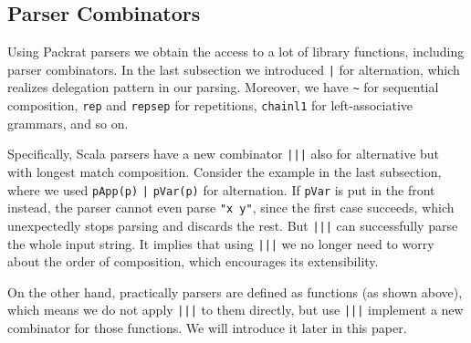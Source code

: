 \subsection{Parser Combinators}\label{subsec:parsercombinators}

Using Packrat parsers we obtain the access to a lot of library functions, including parser combinators. In the last subsection we introduced \lstinline{|} for alternation, which realizes delegation pattern in our parsing. Moreover, we have \lstinline{~} for sequential composition, \lstinline{rep} and \lstinline{repsep} for repetitions, \lstinline{chainl1} for left-associative grammars, and so on.

Specifically, Scala parsers have a new combinator \lstinline{|||} also for alternative but with longest match composition. Consider the example in the last subsection, where we used \lstinline{pApp(p)} \lstinline{|} \lstinline{pVar(p)} for alternation. If \lstinline{pVar} is put in the front instead, the parser cannot even parse \lstinline{"x y"}, since the first case succeeds, which unexpectedly stops parsing and discards the rest. But \lstinline{|||} can successfully parse the whole input string. It implies that using \lstinline{|||} we no longer need to worry about the order of composition, which encourages its extensibility.

On the other hand, practically parsers are defined as functions (as shown above), which means we do not apply \lstinline{|||} to them directly, but use \lstinline{|||} implement a new combinator for those functions. We will introduce it later in this paper. 